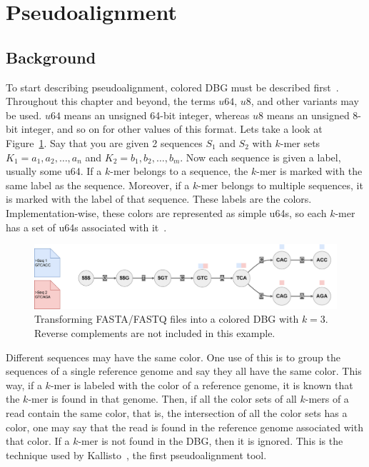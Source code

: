 \section{Pseudoalignment}\label{sec:Pseudoalignment}

\subsection{Background}

To start describing pseudoalignment, colored DBG must be described first~\cite{CDBG, SuccinctColoredDeBruijnGraphs}.
Throughout this chapter and beyond, the terms $u64$, $u8$, and other variants may be used.
$u64$ means an unsigned 64-bit integer, whereas $u8$ means an unsigned 8-bit integer, and so on for other values of this format.
Lets take a look at Figure~\ref{fig:FastaqToCdbg}.
Say that you are given 2 sequences $S_1$ and $S_2$ with $k$-mer sets $K_1 = a_1, a_2, \ldots, a_n$ and $K_2 = b_1, b_2, \ldots, b_m$.
Now each sequence is given a label, usually some u64.
If a $k$-mer belongs to a sequence, the $k$-mer is marked with the same label as the sequence.
Moreover, if a $k$-mer belongs to multiple sequences, it is marked with the label of that sequence.
These labels are the colors.
Implementation-wise, these colors are represented as simple u64s, so each $k$-mer has a set of u64s associated with it~\cite{Themisto}.

\begin{figure}[t]
  \centering
  \includegraphics[width=\textwidth]{images/FastaqToCdbg.png}
  \caption{Transforming FASTA/FASTQ files into a colored DBG with $k=3$. Reverse complements are not included in this example.}\label{fig:FastaqToCdbg}
\end{figure}

Different sequences may have the same color.
One use of this is to group the sequences of a single reference genome and say they all have the same color.
This way, if a $k$-mer is labeled with the color of a reference genome, it is known that the $k$-mer is found in that genome.
Then, if all the color sets of all $k$-mers of a read contain the same color, that is, the intersection of all the color sets has a color, one may say that the read is found in the reference genome associated with that color.
If a $k$-mer is not found in the DBG, then it is ignored.
This is the technique used by Kallisto~\cite{Kallisto}, the first pseudoalignment tool.

